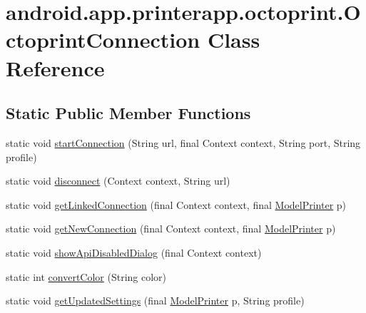 \hypertarget{classandroid_1_1app_1_1printerapp_1_1octoprint_1_1_octoprint_connection}{}\section{android.\+app.\+printerapp.\+octoprint.\+Octoprint\+Connection Class Reference}
\label{classandroid_1_1app_1_1printerapp_1_1octoprint_1_1_octoprint_connection}
\subsection*{Static Public Member Functions}
\begin{DoxyCompactItemize}
\item 
static void \hyperlink{classandroid_1_1app_1_1printerapp_1_1octoprint_1_1_octoprint_connection_ad721cab32888b9d25310d554cf7714e3}{start\+Connection} (String url, final Context context, String port, String profile)
\item 
static void \hyperlink{classandroid_1_1app_1_1printerapp_1_1octoprint_1_1_octoprint_connection_aab02ef037b086aeeba3170084282df1d}{disconnect} (Context context, String url)
\item 
static void \hyperlink{classandroid_1_1app_1_1printerapp_1_1octoprint_1_1_octoprint_connection_a27735987deae4dc8da0502686868be5f}{get\+Linked\+Connection} (final Context context, final \hyperlink{classandroid_1_1app_1_1printerapp_1_1model_1_1_model_printer}{Model\+Printer} p)
\item 
static void \hyperlink{classandroid_1_1app_1_1printerapp_1_1octoprint_1_1_octoprint_connection_a263de2b33bf33ff2339f7307ba545175}{get\+New\+Connection} (final Context context, final \hyperlink{classandroid_1_1app_1_1printerapp_1_1model_1_1_model_printer}{Model\+Printer} p)
\item 
static void \hyperlink{classandroid_1_1app_1_1printerapp_1_1octoprint_1_1_octoprint_connection_a40c048fe9317c5c8bd1fa089fa323aa7}{show\+Api\+Disabled\+Dialog} (final Context context)
\item 
static int \hyperlink{classandroid_1_1app_1_1printerapp_1_1octoprint_1_1_octoprint_connection_aac6590890bf09bc60b27af00a6d6bfc1}{convert\+Color} (String color)
\item 
static void \hyperlink{classandroid_1_1app_1_1printerapp_1_1octoprint_1_1_octoprint_connection_a57773e4742e779bc5117add9f2f59dc3}{get\+Updated\+Settings} (final \hyperlink{classandroid_1_1app_1_1printerapp_1_1model_1_1_model_printer}{Model\+Printer} p, String profile)

\end{DoxyCompactItemize}
